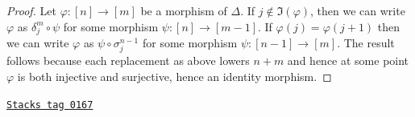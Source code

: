 \begin{proof}
Let $\varphi : [n] \to [m]$ be a morphism of $\Delta$.
If $j \not \in \Im(\varphi)$, then we can write
$\varphi$ as $\delta^m_j \circ \psi$ for some morphism
$\psi : [n] \to [m - 1]$. If $\varphi(j) = \varphi(j + 1)$
then we can write $\varphi$ as $\psi \circ \sigma^{n - 1}_j$
for some morphism $\psi : [n - 1] \to [m]$.
The result follows because each replacement
as above lowers $n + m$ and hence at some point
$\varphi$ is both injective and surjective, hence
an identity morphism.
\end{proof}

\begin{lemma}
\label{simplicial-lemma-relations-face-degeneracy}
\href{https://stacks.math.columbia.edu/tag/0167}{\texttt{Stacks tag 0167}}


\end{lemma}
